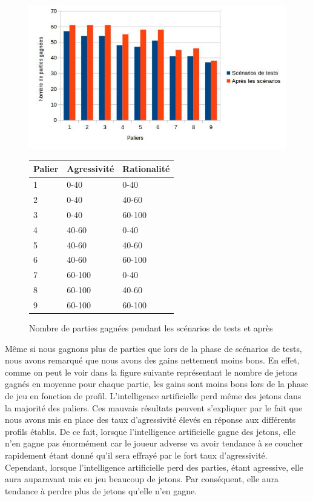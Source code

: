 \documentclass{report}
\begin{document}
\begin{figure}[H]
	\begin{center}
		\includegraphics[scale=0.5]{./imagesRapport/PremierCalibrageComparaisonNombrePartiesGagnees.jpg}
		
		\hspace{-1.5cm}\begin{tabular}{|l|l|l|}
			\hline
			Palier & 	Agressivité &	Rationalité\\
			\hline
			 1 & 0-40 & 0-40\\
			\hline
			 2 & 	0-40 & 40-60\\
			\hline
			 3 & 0-40 & 60-100\\
			\hline
			 4 & 	40-60 & 0-40\\
			\hline
			 5 & 40-60 & 40-60\\
			\hline
			 6 & 40-60 & 60-100\\
			\hline
			 7 & 60-100 & 0-40\\
			\hline
			 8 & 60-100 & 40-60\\
			\hline
			 9 & 60-100 & 60-100\\
			\hline
		\end{tabular}
		
	\end{center}
	\caption{Nombre de parties gagnées pendant les scénarios de tests et après}
\end{figure}


Même si nous gagnons plus de parties que lors de la phase de scénarios de tests, nous avons remarqué que nous avons des gains nettement moins bons. En effet, comme on peut le voir dans la figure suivante représentant le nombre de jetons gagnés en moyenne pour chaque partie, les gains sont moins bons lors de la phase de jeu en fonction de profil. L'intelligence artificielle perd même des jetons dans la majorité des paliers. Ces mauvais résultats peuvent s'expliquer par le fait que nous avons mis en place des taux d'agressivité élevés en réponse aux différents profils établis. De ce fait, lorsque l'intelligence artificielle gagne des jetons, elle n'en gagne pas énormément car le joueur adverse va avoir tendance à se coucher rapidement étant donné qu'il sera effrayé par le fort taux d'agressivité. Cependant, lorsque l'intelligence artificielle perd des parties, étant agressive, elle aura auparavant mis en jeu beaucoup de jetons. Par conséquent, elle aura tendance à perdre plus de jetons qu'elle n'en gagne.\par
\end{document}
